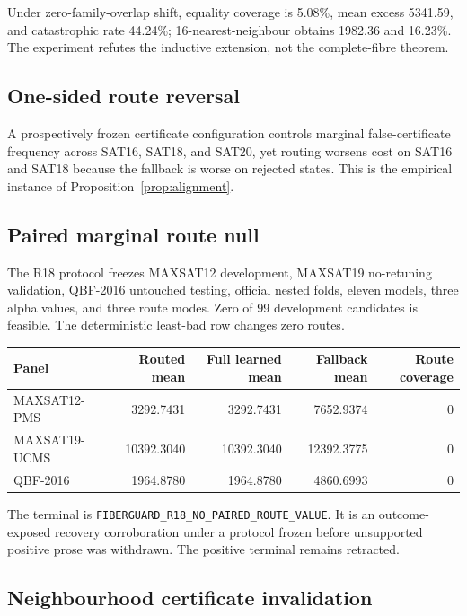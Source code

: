 \documentclass[11pt]{article}
\theoremstyle{definition}
\theoremstyle{remark}
\begin{document}
Under zero-family-overlap shift, equality coverage is 5.08\%, mean excess 5341.59, and catastrophic rate 44.24\%; 16-nearest-neighbour obtains 1982.36 and 16.23\%.  The experiment refutes the inductive extension, not the complete-fibre theorem.

\subsection{One-sided route reversal}

A prospectively frozen certificate configuration controls marginal false-certificate frequency across SAT16, SAT18, and SAT20, yet routing worsens cost on SAT16 and SAT18 because the fallback is worse on rejected states.  This is the empirical instance of Proposition~\ref{prop:alignment}.

\subsection{Paired marginal route null}

The R18 protocol freezes MAXSAT12 development, MAXSAT19 no-retuning validation, QBF-2016 untouched testing, official nested folds, eleven models, three alpha values, and three route modes.  Zero of 99 development candidates is feasible.  The deterministic least-bad row changes zero routes.

\begin{center}
\begin{tabular}{lrrrr}
\toprule
Panel & Routed mean & Full learned mean & Fallback mean & Route coverage\\
\midrule
MAXSAT12-PMS & 3292.7431 & 3292.7431 & 7652.9374 & 0\\
MAXSAT19-UCMS & 10392.3040 & 10392.3040 & 12392.3775 & 0\\
QBF-2016 & 1964.8780 & 1964.8780 & 4860.6993 & 0\\
\bottomrule
\end{tabular}
\end{center}

The terminal is \texttt{FIBERGUARD\_R18\_NO\_PAIRED\_ROUTE\_VALUE}.  It is an outcome-exposed recovery corroboration under a protocol frozen before unsupported positive prose was withdrawn.  The positive terminal remains retracted.

\subsection{Neighbourhood certificate invalidation}
\end{document}
